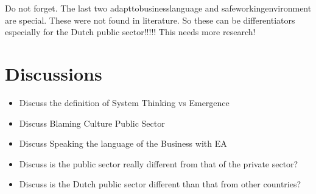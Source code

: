 \begin{remark}
	Do not forget. The last two \gls{adapttobusinesslanguage} and \gls{safeworkingenvironment} are special. These were not found in literature. So these can be differentiators especially for the Dutch public sector!!!!! This needs more research!
\end{remark}


%				

\section{Discussions}
\label{sec:discussions}

\begin{itemize}
	\item{Discuss the definition of System Thinking vs Emergence}
	\item{Discuss Blaming Culture Public Sector}
	\item{Discuss Speaking the language of the Business with EA}
	\item{Discuss is the public sector really different from that of the private sector?}
	\item{Discuss is the Dutch public sector different than that from other countries?}
\end{itemize}

